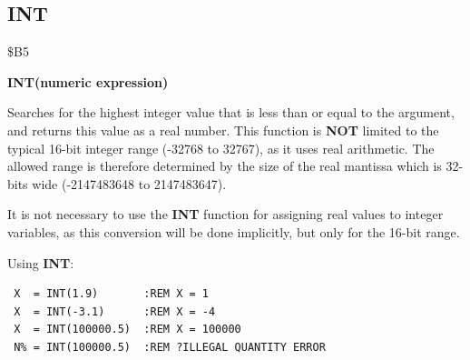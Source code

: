
\newpage
\subsection{INT}
\begin{description}[leftmargin=2cm,style=nextline]
\item [Token:] \$B5
\item [Format:] {\bf INT(numeric expression)}
\item [Usage:] Searches for the highest
               integer value that is less than or equal to the argument,
               and returns this value as a real number.
               This function is {\bf NOT} limited to the typical
               16-bit integer range (-32768 to 32767), as
               it uses real arithmetic. The allowed range is
               therefore determined by the size of the real
               mantissa which is 32-bits wide (-2147483648 to 2147483647).

\item [Remarks:] It is not necessary to use the {\bf INT}
               function for assigning real values to integer
               variables, as this conversion will be done
               implicitly, but only for the 16-bit range.

\item [Examples:] Using {\bf INT}:
\begin{tcolorbox}[colback=black,coltext=white]
\verbatimfont{\codefont}
\begin{verbatim}
 X  = INT(1.9)       :REM X = 1
 X  = INT(-3.1)      :REM X = -4
 X  = INT(100000.5)  :REM X = 100000
 N% = INT(100000.5)  :REM ?ILLEGAL QUANTITY ERROR
\end{verbatim}
\end{tcolorbox}
\end{description}


\newpage
